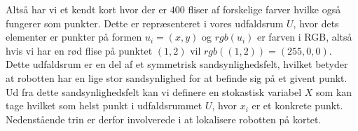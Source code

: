 \documentclass[../../SRP.tex]{subfiles}
\begin{document}

\begin{center}
\end{center}

Altså har vi et kendt kort hvor der er $400$ fliser af forskelige farver hvilke også fungerer som punkter. Dette er repræsenteret i vores udfaldsrum $U$, hvor dets elementer er punkter på formen $u_i = (x,y)$ og $rgb(u_i)$ er farven i RGB, altså hvis vi har en rød flise på punktet $(1,2)$ vil $rgb((1,2)) = (255,0,0)$. Dette udfaldsrum er en del af et symmetrisk sandsynlighedsfelt, hvilket betyder at robotten har en lige stor sandsynlighed for at befinde sig på et givent punkt. Ud fra dette sandsynlighedsfelt kan vi definere en stokastisk variabel $X$ som kan tage hvilket som helst punkt i udfaldsrummet $U$, hvor $x_i$ er et konkrete punkt. Nedenstående trin er derfor involverede i at lokalisere robotten på kortet.
\end{document}
